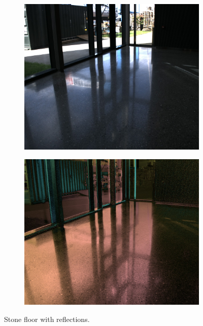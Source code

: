\begin{figure}[H]
    \begin{subfigure}[T]{.49\textwidth}
        \includegraphics[width=\textwidth]{figures/pictures/img_9222_s0.jpg}
    \end{subfigure} \hfill
    \begin{subfigure}[T]{.49\textwidth}
        \includegraphics[width=\textwidth]{figures/pictures/img_9222_pol.jpg}
    \end{subfigure}
    \caption{Stone floor with reflections.}
\end{figure}
\vspace{-.5cm}

